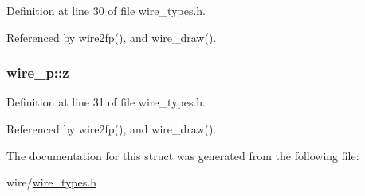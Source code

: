 Definition at line 30 of file wire\-\_\-types.\-h.



Referenced by wire2fp(), and wire\-\_\-draw().

\hypertarget{structwire__p_a423cfb83825fc447478c866e4c2f6520}{
\subsubsection[{z}]{ wire\-\_\-p\-::z}}\label{structwire__p_a423cfb83825fc447478c866e4c2f6520}


Definition at line 31 of file wire\-\_\-types.\-h.



Referenced by wire2fp(), and wire\-\_\-draw().



The documentation for this struct was generated from the following file\-:\begin{DoxyCompactItemize}
\item 
wire/\hyperlink{wire__types_8h}{wire\-\_\-types.\-h}\end{DoxyCompactItemize}
